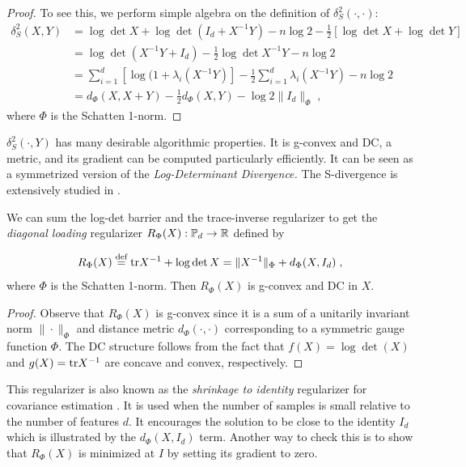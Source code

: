 \documentclass[sn-nature]{sn-jnl}%
\theoremstyle{thmstyleone}%
\theoremstyle{thmstyletwo}%
\theoremstyle{thmstylethree}%
\begin{document}
\begin{proof}
To see this, we perform simple algebra on the definition of $\delta_S^2(\cdot,\cdot)$:
\[
\begin{aligned}
    \delta_S^2(X,Y) &= \log \det X + \log \det \left(I_d + X^{-1}Y \right)  - n \log 2 - \frac{1}{2}\left[\log \det X + \log \det Y \right]
    \\&= \log \det \left(X^{-1} Y + I_d\right) - \frac{1}{2}\log \det X^{-1}Y - n\log 2
    \\&= \sum_{i=1}^d \left[ \log (1 + \lambda_i(X^{-1}Y) \right] - \frac{1}{2}\sum_{i=1}^d \lambda_i(X^{-1}Y) - n \log 2
    \\&= d_\Phi(X, X+Y) - \frac{1}{2}d_\Phi(X,Y) - \log2 \|I_d\|_\Phi \; ,
\end{aligned}
\]
where $\Phi$ is the Schatten 1-norm. 
\end{proof}

$\delta_S^2(\cdot, Y)$ has many desirable algorithmic properties. It is g-convex and DC, a metric, and its gradient can be computed particularly efficiently. It can be seen as a symmetrized version of the \textit{Log-Determinant Divergence.} The S-divergence is extensively studied in \cite{sra2013sdivergence}. 


\begin{prop}\label{prop:diagonal_loading}
 We can sum the log-det barrier and the trace-inverse regularizer to get the \textit{diagonal loading} regularizer $R_\Phi(X): \mathbb{P}_d \to \mathbb{R}$ defined by 

$$R_\Phi(X) \stackrel{\text{def}}{=} \text{tr} X^{-1} + \log \det X = \|X^{-1}\|_{\Phi} + d_{\Phi}(X,I_d) \; ,$$
where $\Phi$ is the Schatten 1-norm. Then $R_\Phi(X)$ is g-convex and DC in $X$.
\end{prop}
\begin{proof}
    Observe that $R_\Phi(X)$ is g-convex since it is a sum of a unitarily invariant norm $\|\cdot\|_\Phi$ and distance metric $d_\Phi(\cdot,\cdot)$ corresponding to a symmetric gauge function $\Phi$. The DC structure follows from the fact that $f(X) = \log \det (X)$ and $g(X) = \text{tr} X^{-1}$ are concave and convex, respectively.
\end{proof}


This regularizer is also known as the \textit{shrinkage to identity} regularizer for covariance estimation \cite{structuredcovestimation_wiesel}. It is used when the number of samples is small relative to the number of features $d$. It encourages the solution to be close to the identity $I_d$ which is illustrated by the $d_\Phi(X, I_d)$ term. Another way to check this is to show that $R_\Phi(X)$ is minimized at $I$ by setting its gradient to zero. 
\end{document}
